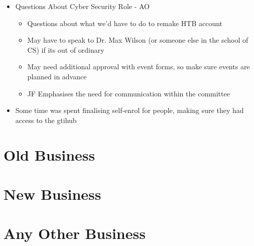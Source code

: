 \documentclass[11pt,hacksoc]{meetingmins}
\begin{document}
\begin{itemize}
\item Questions About Cyber Security Role - AO
\begin{itemize}
  \item Questions about what we'd have to do to remake HTB account
  \item May have to speak to Dr. Max Wilson (or someone else in the school of CS) if its out of ordinary
  \item May need additional approval with event forms, so make sure events are planned in advance
  \item JF Emphasises the need for communication within the committee
\end{itemize}

 
\item Some time was spent finalising self-enrol for people, making sure they had access to the gtihub



\end{itemize}

\section{Old Business}

\section{New Business}

\section{Any Other Business}

\vspace{1em}
\end{document}
